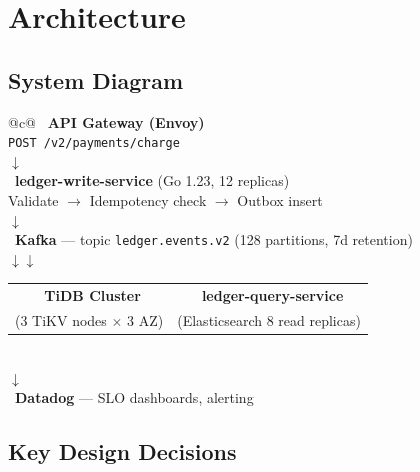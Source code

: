 \section{Architecture}

\subsection{System Diagram}

\begin{archbox}
\begin{center}
\vspace{2pt}
\small
\begin{tabular}{@{}c@{}}
{\color{accent}\faServer}\ \textbf{API Gateway (Envoy)} \\
\texttt{POST /v2/payments/charge} \\
$\downarrow$ \\[2pt]
{\color{accent}\faCodeBranch}\ \textbf{ledger-write-service} (Go 1.23, 12 replicas) \\
Validate $\to$ Idempotency check $\to$ Outbox insert \\
$\downarrow$ \\[2pt]
{\color{accent}\faStream}\ \textbf{Kafka} — topic \texttt{ledger.events.v2} (128 partitions, 7d retention) \\
$\downarrow$\hspace{10mm}$\downarrow$ \\[2pt]
\begin{tabular}{cc}
{\color{accent}\faDatabase}\ \textbf{TiDB Cluster} &
{\color{accent}\faSearch}\ \textbf{ledger-query-service} \\
(3 TiKV nodes $\times$ 3 AZ) & (Elasticsearch 8 read replicas) \\
\end{tabular} \\[4pt]
$\downarrow$ \\[2pt]
{\color{accent}\faChartBar}\ \textbf{Datadog} — SLO dashboards, alerting
\end{tabular}
\vspace{2pt}
\end{center}
\end{archbox}

\vspace{6pt}

\subsection{Key Design Decisions}

